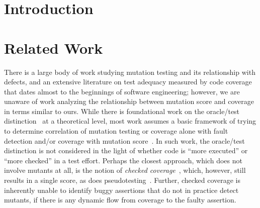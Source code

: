 \documentclass[sigconf,review, anonymous]{acmart}
\begin{document}
\section{Introduction}

\section{Related Work}

There is a large body of work studying mutation testing and its relationship 
with defects, and an extensive literature on test adequacy measured by
code coverage that dates almost to the beginnings of software
engineering; however, we are
unaware of work analyzing the relationship
between mutation score and coverage in terms similar to ours.   While
there is foundational work on the oracle/test
distinction~\cite{StaatsOracle} at a theoretical level, most work assumes a basic framework of  trying to determine
correlation of mutation testing or coverage alone with fault
detection and/or coverage with mutation score~\cite{papadakis2018mutation,PapadakisStudy,ThierryStudy}.  In
such work, the oracle/test distinction is not considered in the
light of whether code is ``more executed'' or ``more checked'' in a
test effort.  Perhaps the
closest approach, which does not involve mutants at all, is the notion
of \emph{checked coverage}~\cite{ZellerCheckedCov}, which, however, still results in a
single score, as does pseudotesting~\cite{pseudotestingorig,
  pseudotestingstudy, descartes}.  Further, checked coverage is
inherently unable to identify buggy assertions that do not in practice
detect mutants, if there is any dynamic flow
from coverage to the faulty assertion.

\end{document}
